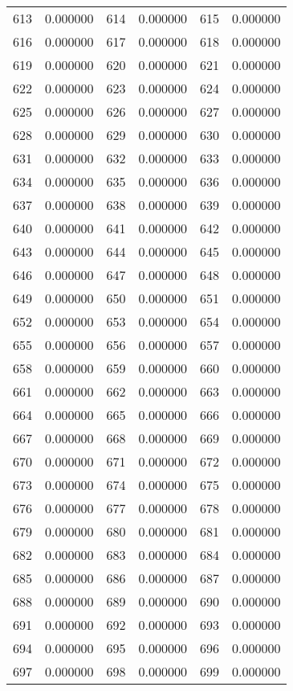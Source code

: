 \documentclass[12pt]{article}
\begin{document}
\begin{longtable}{@{}cc|cc|cc@{}}
613 & 0.000000 & 614 & 0.000000 & 615 & 0.000000 \\
616 & 0.000000 & 617 & 0.000000 & 618 & 0.000000 \\
619 & 0.000000 & 620 & 0.000000 & 621 & 0.000000 \\
622 & 0.000000 & 623 & 0.000000 & 624 & 0.000000 \\
625 & 0.000000 & 626 & 0.000000 & 627 & 0.000000 \\
628 & 0.000000 & 629 & 0.000000 & 630 & 0.000000 \\
631 & 0.000000 & 632 & 0.000000 & 633 & 0.000000 \\
634 & 0.000000 & 635 & 0.000000 & 636 & 0.000000 \\
637 & 0.000000 & 638 & 0.000000 & 639 & 0.000000 \\
640 & 0.000000 & 641 & 0.000000 & 642 & 0.000000 \\
643 & 0.000000 & 644 & 0.000000 & 645 & 0.000000 \\
646 & 0.000000 & 647 & 0.000000 & 648 & 0.000000 \\
649 & 0.000000 & 650 & 0.000000 & 651 & 0.000000 \\
652 & 0.000000 & 653 & 0.000000 & 654 & 0.000000 \\
655 & 0.000000 & 656 & 0.000000 & 657 & 0.000000 \\
658 & 0.000000 & 659 & 0.000000 & 660 & 0.000000 \\
661 & 0.000000 & 662 & 0.000000 & 663 & 0.000000 \\
664 & 0.000000 & 665 & 0.000000 & 666 & 0.000000 \\
667 & 0.000000 & 668 & 0.000000 & 669 & 0.000000 \\
670 & 0.000000 & 671 & 0.000000 & 672 & 0.000000 \\
673 & 0.000000 & 674 & 0.000000 & 675 & 0.000000 \\
676 & 0.000000 & 677 & 0.000000 & 678 & 0.000000 \\
679 & 0.000000 & 680 & 0.000000 & 681 & 0.000000 \\
682 & 0.000000 & 683 & 0.000000 & 684 & 0.000000 \\
685 & 0.000000 & 686 & 0.000000 & 687 & 0.000000 \\
688 & 0.000000 & 689 & 0.000000 & 690 & 0.000000 \\
691 & 0.000000 & 692 & 0.000000 & 693 & 0.000000 \\
694 & 0.000000 & 695 & 0.000000 & 696 & 0.000000 \\
697 & 0.000000 & 698 & 0.000000 & 699 & 0.000000 \\

\end{longtable}
\end{document}
